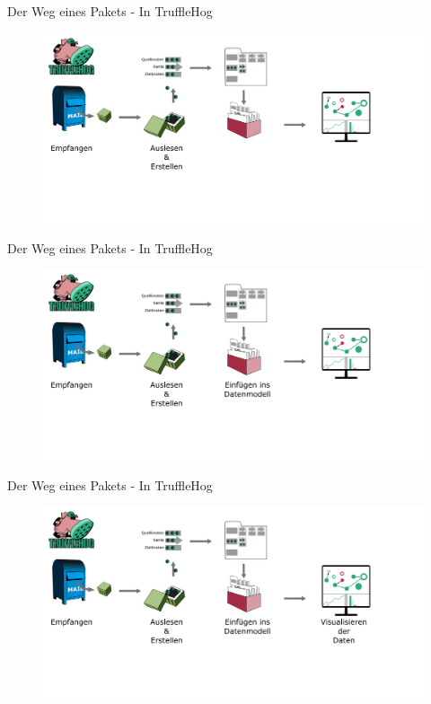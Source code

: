 \begin{frame}{Der Weg eines Pakets - In TruffleHog}
	\begin{figure}
		\centering
		\includegraphics[width=\textwidth]{./images/path_trufflehog/2.png}
	\end{figure}
\end{frame}

\begin{frame}{Der Weg eines Pakets - In TruffleHog}
	\begin{figure}
		\centering
		\includegraphics[width=\textwidth]{./images/path_trufflehog/3.png}
	\end{figure}
\end{frame}

\begin{frame}{Der Weg eines Pakets - In TruffleHog}
	\begin{figure}
		\centering
		\includegraphics[width=\textwidth]{./images/path_trufflehog/4.png}
	\end{figure}
\end{frame}